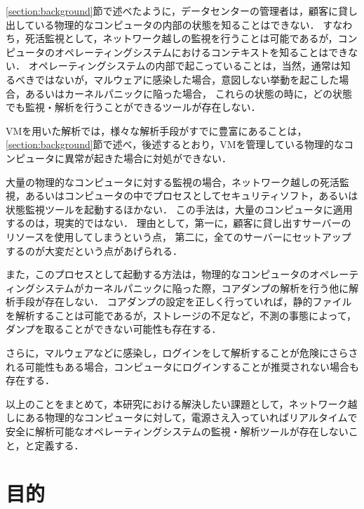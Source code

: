 \ref{section:background}節で述べたように，データセンターの管理者は，顧客に貸し出している物理的なコンピュータの内部の状態を知ることはできない．
すなわち，死活監視として，ネットワーク越しの監視を行うことは可能であるが，コンピュータのオペレーティングシステムにおけるコンテキストを知ることはできない．
オペレーティングシステムの内部で起こっていることは，当然，通常は知るべきではないが，マルウェアに感染した場合，意図しない挙動を起こした場合，あるいはカーネルパニックに陥った場合，
これらの状態の時に，どの状態でも監視・解析を行うことができるツールが存在しない．

VMを用いた解析では，様々な解析手段がすでに豊富にあることは，\ref{section:background}節で述べ，後述するとおり，VMを管理している物理的なコンピュータに異常が起きた場合に対処ができない．


大量の物理的なコンピュータに対する監視の場合，ネットワーク越しの死活監視，あるいはコンピュータの中でプロセスとしてセキュリティソフト，あるいは状態監視ツールを起動するほかない．
この手法は，大量のコンピュータに適用するのは，現実的ではない．
理由として，第一に，顧客に貸し出すサーバーのリソースを使用してしまうという点，
第二に，全てのサーバーにセットアップするのが大変だという点があげられる．

また，このプロセスとして起動する方法は，物理的なコンピュータのオペレーティングシステムがカーネルパニックに陥った際，コアダンプの解析を行う他に解析手段が存在しない．
コアダンプの設定を正しく行っていれば，静的ファイルを解析することは可能であるが，ストレージの不足など，不測の事態によって，ダンプを取ることができない可能性も存在する．

さらに，マルウェアなどに感染し，ログインをして解析することが危険にさらされる可能性もある場合，コンピュータにログインすることが推奨されない場合も存在する．

以上のことをまとめて，本研究における解決したい課題として，ネットワーク越しにある物理的なコンピュータに対して，電源さえ入っていればリアルタイムで安全に解析可能なオペレーティングシステムの監視・解析ツールが存在しないこと，と定義する．



\section{目的}
\label{section:purpose}

